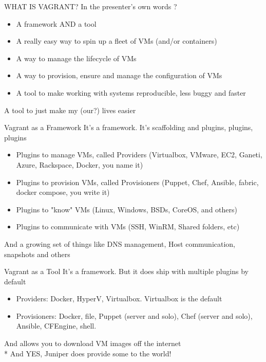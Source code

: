 \documentclass{beamer}
\begin{document}
    \begin{frame}{WHAT IS VAGRANT?}
        In the presenter's own words ?
        \begin{itemize}
        \pause \item A framework AND a tool
        \pause \item A really easy way to spin up a fleet of VMs (and/or containers)
        \pause \item A way to manage the lifecycle of VMs
        \pause \item A way to provision, ensure and manage the configuration of VMs
        \pause \item A tool to make working with systems reproducible, less buggy and faster
        \end{itemize}
    A tool to just make my (our?) lives easier
    \end{frame}

    \begin{frame}{Vagrant as a Framework}
        It's a framework. It's scaffolding and plugins, plugins, plugins
        \begin{itemize}
        \pause \item Plugins to manage VMs, called Providers (Virtualbox, VMware, EC2, Ganeti, Azure, Rackspace, Docker, you name it)
        \pause \item Plugins to provision VMs, called Provisioners (Puppet, Chef, Ansible, fabric, docker compose, you write it)
        \pause \item Plugins to "know" VMs (Linux, Windows, BSDs, CoreOS, and others)
        \pause \item Plugins to communicate with VMs (SSH, WinRM, Shared folders, etc)
        \end{itemize}
    And a growing set of things like DNS management, Host communication, snapshots and others
    \end{frame}

    \begin{frame}{Vagrant as a Tool}
        It's a framework. But it does ship with multiple plugins by default
        \begin{itemize}
        \pause \item Providers: Docker, HyperV, Virtualbox. Virtualbox is the default
        \pause \item Provisioners: Docker, file, Puppet (server and solo), Chef (server and solo), Ansible, CFEngine, shell.
        \end{itemize}
    \pause And allows you to download VM images off the internet
    \pause \\* And YES, Juniper does provide some to the world!
    \end{frame}
\end{document}
